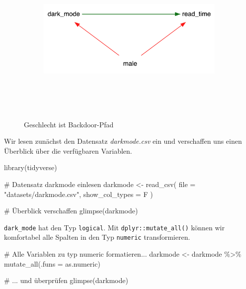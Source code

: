 \documentclass[
  a4paper,
  DIV=11,
  oneside]{scrreprt}
\newenvironment{Shaded}{\begin{snugshade}}{\end{snugshade}}
\newcommand{\NormalTok}[1]{\textcolor[rgb]{0.00,0.23,0.31}{#1}}
\begin{document}
\begin{figure}

{\centering 

\begin{figure}[H]

{\centering \includegraphics[width=4in,height=3in]{Matching_files/figure-latex/dot-figure-1.png}

}

\end{figure}

}

\caption{\label{fig-CDdarkmode}Geschlecht ist Backdoor-Pfad}

\end{figure}

Wir lesen zunächst den Datensatz \emph{darkmode.csv} ein und verschaffen
uns einen Überblick über die verfügbaren Variablen.

\begin{Shaded}
\begin{Highlighting}[]
\NormalTok{library(tidyverse)}

\NormalTok{\# Datensatz \textquotesingle{}darkmode\textquotesingle{} einlesen}
\NormalTok{darkmode \textless{}{-} read\_csv(}
\NormalTok{  file = "datasets/darkmode.csv", }
\NormalTok{  show\_col\_types = F}
\NormalTok{)}

\NormalTok{\# Überblick verschaffen}
\NormalTok{glimpse(darkmode)}
\end{Highlighting}
\end{Shaded}

\texttt{dark\_mode} hat den Typ \texttt{logical}. Mit
\texttt{dplyr::mutate\_all()} können wir komfortabel alle Spalten in den
Typ \texttt{numeric} transformieren.

\begin{Shaded}
\begin{Highlighting}[]
\NormalTok{\# Alle Variablen zu typ \textquotesingle{}numeric\textquotesingle{} formatieren...}
\NormalTok{darkmode \textless{}{-} darkmode \%\textgreater{}\% }
\NormalTok{  mutate\_all(.funs = as.numeric)}

\NormalTok{\# ... und überprüfen}
\NormalTok{glimpse(darkmode)}
\end{Highlighting}
\end{Shaded}
\end{document}
